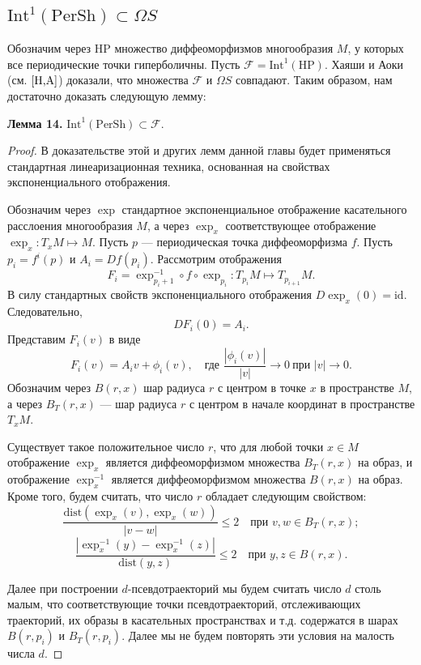 \documentclass[12pt]{article}
\begin{document}
\subsection{$\mbox{Int}^1(\mbox{PerSh})\subset\Omega S$}

Обозначим через HP множество диффеоморфизмов многообразия $M$, у которых все периодические точки гиперболичны. Пусть $\mathcal{F}=\mbox{Int}^1(\mbox{HP})$. Хаяши и Аоки (см. $\cite{H,A}$) доказали, что множества $\mathcal{F}$ и $\Omega S$ совпадают. Таким образом, нам достаточно доказать следующую лемму:

\textbf{Лемма 14.} $\mbox{Int}^1(\mbox{PerSh})\subset\mathcal{F}$.

\begin{proof}
В доказательстве этой и других лемм данной главы будет применяться стандартная линеаризационная техника, основанная на свойствах экспоненциального отображения.

Обозначим через $\exp$ стандартное экспоненциальное отображение касательного расслоения многообразия $M$, а через $\exp_x$ соответствующее отображение $\exp_x:T_x M\mapsto M$.
Пусть $p$ --- периодическая точка диффеоморфизма $f$. Пусть $p_i=f^i(p)$ и $A_i=Df(p_i)$. Рассмотрим отображения
\begin{equation}
\label{3.2.1}
F_i=\exp^{-1}_{p_i+1}\circ f\circ\exp_{p_i}:T_{p_i}M\mapsto T_{p_{i+1}}M.
\end{equation}
В силу стандартных свойств экспоненциального отображения $D\exp_x(0)=\mbox{id}$. Следовательно, $$DF_i(0)=A_i.$$
Представим $F_i(v)$ в виде
$$F_i(v)=A_iv+\phi_i(v),\quad\mbox{где }\frac{|\phi_i(v)|}{|v|}\longrightarrow0\ \mbox{при }|v|\rightarrow0.$$
Обозначим через $B(r,x)$ шар радиуса $r$ с центром в точке $x$ в пространстве $M$, а через $B_T(r,x)$ --- шар радиуса $r$ с центром в начале координат в пространстве $T_xM$. 

Существует такое положительное число $r$, что для любой точки $x\in M$ отображение $\exp_x$ является диффеоморфизмом множества $B_T(r,x)$ на образ, и отображение $\exp^{-1}_x$ является диффеоморфизмом множества $B(r,x)$ на образ. Кроме того, будем считать, что число $r$ обладает следующим свойством:
$$\frac{\mbox{dist}(\exp_x(v),\exp_x(w))}{|v-w|}\leq 2\quad\mbox{при }v,w\in B_T(r,x);$$
$$\frac{|\exp^{-1}_x(y)-\exp^{-1}_x(z)|}{\mbox{dist}(y,z)}\leq 2\quad\mbox{при }y,z\in B(r,x).$$

Далее при построении $d$-псевдотраекторий мы будем считать число $d$ столь малым, что соответствующие точки псевдотраекторий, отслеживающих траекторий, их образы в касательных пространствах и т.д. содержатся в шарах $B(r,p_i)$ и $B_T(r,p_i)$. Далее мы не будем повторять эти условия на малость числа $d$.


\end{proof}
\end{document}
